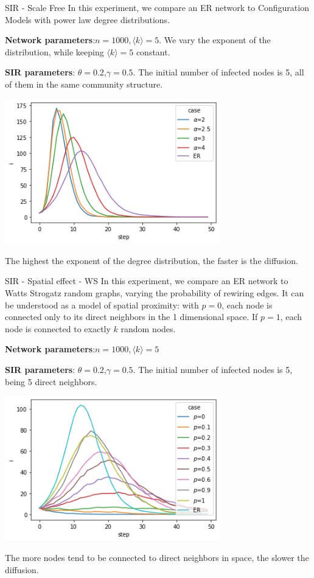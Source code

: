 \documentclass[a4paper,11pt]{book}
\begin{document}
\begin{textbox}{SIR - Scale Free}
In this experiment, we compare an ER network to Configuration Models with power law degree distributions. 

\textbf{Network parameters}:$n=1000,\langle k \rangle=5$. We vary the exponent of the distribution, while keeping $\langle k \rangle=5$ constant.

\textbf{SIR parameters}: $\theta=0.2$,$\gamma=0.5$.
The initial number of infected nodes is 5, all of them in the same community structure.

\centering
\includegraphics[width=0.7\textwidth]{pics/SIRpowerlaw.png}

The highest the exponent of the degree distribution, the faster is the diffusion.

\end{textbox}

\begin{textbox}{SIR - Spatial effect - WS}
In this experiment, we compare an ER network to Watts Strogatz random graphs, varying the probability of rewiring edges. It can be understood as a model of spatial proximity: with $p=0$, each node is connected only to its direct neighbors in the 1 dimensional space. If $p=1$, each node is connected to exactly $k$ random nodes.

\textbf{Network parameters}:$n=1000,\langle k \rangle=5$

\textbf{SIR parameters}: $\theta=0.2$,$\gamma=0.5$.
The initial number of infected nodes is 5, being 5 direct neighbors.

\centering

\includegraphics[width=0.7\textwidth]{pics/SIR_WS.png}

The more nodes tend to be connected to direct neighbors in space, the slower the diffusion. 

\end{textbox}
\end{document}
